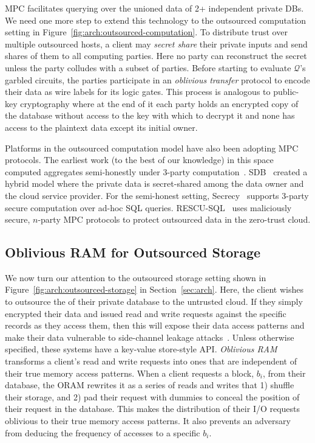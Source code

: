 \documentclass[11pt]{article}
\newcommand{\shortsection}[1]{\vspace{0.2em}\noindent {\bf #1.}}
\newcommand{\query}{$\mathcal{Q}$\xspace}
\begin{document}
\shortsection{Outsourced Computation}  MPC facilitates querying over the unioned data of 2+ independent private DBs.  We need one more step to extend this technology to the outsourced computation setting in Figure~\ref{fig:arch:outsourced-computation}.  To distribute trust over multiple outsourced hosts, a client may  {\em secret share} their private inputs and send shares of them to all computing parties.  Here no  party can reconstruct the secret unless the party colludes with a subset of parties. Before starting to evaluate \query's garbled circuits,  the parties participate in an {\em oblivious transfer} protocol to encode their data as wire labels for its logic gates.   This process is analogous to public-key cryptography where at the end of it each party holds an encrypted copy of the database without access to the key with which to decrypt it and none has access to the plaintext data except its initial owner.   


Platforms in the outsourced computation model have also been adopting MPC protocols.  The earliest work (to the best of our knowledge) in this space computed aggregates semi-honestly under 3-party computation~\cite{bogdanov2008sharemind}.  SDB~\cite{wong2014secure,Zhian2015SDB} created a hybrid model where the private data is secret-shared among the data owner and the cloud service provider.  For the semi-honest setting, Secrecy~\cite{liagouris2023secrecy} supports 3-party secure computation over ad-hoc SQL queries.     RESCU-SQL~\cite{li2023rescu} uses maliciously secure, $n$-party MPC protocols to protect outsourced data in the zero-trust cloud.  




\subsection{Oblivious RAM for Outsourced Storage}
\label{sec:oram}

We now turn our attention to the outsourced storage setting shown in Figure~\ref{fig:arch:outsourced-storage} in Section~\ref{sec:arch}.  Here, the client wishes to outsource the of their private database to the untrusted cloud.  If they simply encrypted their data and issued read and write requests against the specific records as they access them, then this will expose their data access patterns and make their data vulnerable to side-channel leakage attacks~\cite{kellaris2016generic, naveed2015inference, grubbs2016breaking}.  Unless otherwise specified, these systems have a key-value store-style API.   {\em Oblivious RAM}~\cite{goldreich1987oram} transforms a client's read and write requests into ones that are independent of their true memory access patterns. When a client requests a block, $b_i$, from their database, the ORAM rewrites it as a series of reads and writes that 1) shuffle their storage, and 2) pad their request with dummies to conceal the position of their request in the database.    This makes the distribution of their I/O requests oblivious to their true memory access patterns.  It also prevents an adversary from deducing the frequency of accesses to a specific $b_i$.  
\end{document}
